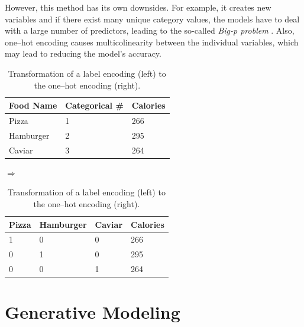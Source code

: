  However, this method has its own downsides. For example, it creates new variables and if there exist many unique category values, the models have to deal with a large number of predictors, leading to the so-called \emph{Big-p problem} \cite{Bigp}. Also, one--hot encoding causes multicolinearity between the individual variables, which may lead to reducing the model's accuracy. 
 \begin{table}[h]
 \centering
 	\begin{tabular}{|l|l|l|}
 		\hline
 		Food Name & Categorical \# & Calories \\ \hline
 		Pizza     & 1              & 266      \\ \hline
 		Hamburger & 2              & 295      \\ \hline
 		Caviar    & 3              & 264      \\ \hline
 	\end{tabular}
 	\quad $\Rightarrow$ \quad
	\begin{tabular}{|l|l|l|l|}
		\hline
		Pizza & Hamburger & Caviar & Calories \\ \hline
		1     & 0         & 0      & 266      \\ \hline
		0     & 1         & 0      & 295      \\ \hline
		0     & 0         & 1      & 264      \\ \hline
	\end{tabular}
	\caption{Transformation of a label encoding (left) to the one--hot encoding (right).}
	\label{tab:OHE}
 \end{table}
\section{Generative Modeling}



